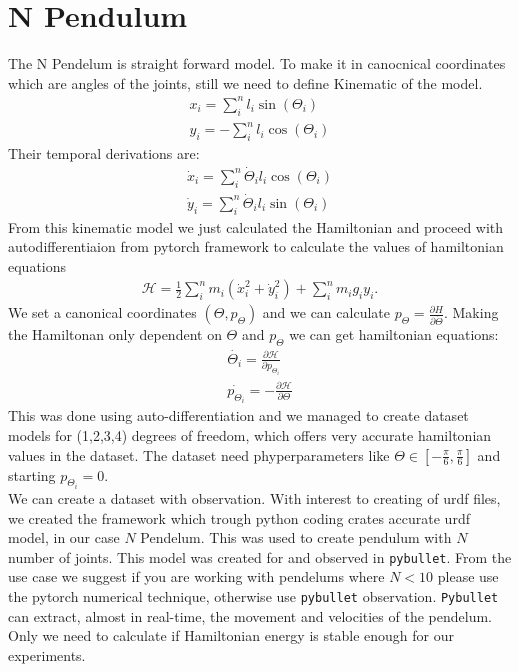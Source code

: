 	


 
 \section{N Pendulum}
 The N Pendelum is straight forward model.
 To make it in canocnical coordinates which are angles of the joints, still we need to define Kinematic of the model.
 \begin{eqnarray}
 	x_i = \sum_i^n l_i\sin(\Theta_i)\\
 	y_i = -\sum_i^n l_i\cos(\Theta_i)
 \end{eqnarray}
Their temporal derivations are:
\begin{eqnarray}
\dot{x}_i = \sum_i^n \dot{\Theta}_i l_i\cos(\Theta_i)\\
	\dot{y}_i = \sum_i^n \dot{\Theta}_i l_i\sin(\Theta_i)
 \end{eqnarray}
From this kinematic model we just calculated the Hamiltonian and proceed with autodifferentiaion from pytorch framework to calculate the values of hamiltonian equations
\begin{eqnarray}
	\mathcal{H} = \frac{1}{2}\sum_i^n m_i (\dot{x}_i^2 + \dot{y}_i^2) + \sum_i^n m_ig_iy_i. 
\end{eqnarray}
We set a canonical coordinates $(\Theta, p_{\Theta})$ and we can calculate $p_{\Theta} = \frac{\partial H}{\partial \dot{\Theta}}$.
Making the Hamiltonan only dependent on $\Theta$ and $p_{\Theta}$ we can get hamiltonian equations:
\begin{eqnarray}
	\dot{\Theta_i} = \frac{\partial \mathcal{H}}{\partial p_{\Theta_i}}\\
	\dot{p_{\Theta_i}} = -\frac{\partial \mathcal{H}}{\partial \Theta}
\end{eqnarray}
This was done using auto-differentiation and we managed to create dataset models for (1,2,3,4) degrees of freedom, which offers very accurate hamiltonian values in the dataset. 
The dataset need phyperparameters like  $\Theta \in [-\frac{\pi}{6},\frac{\pi}{6}]$ and starting $p_{\Theta_i} = 0 $.\\
We can create a dataset with observation. With interest to creating of urdf files, we created the framework which trough python coding crates accurate urdf model, in our case $N$ Pendelum. This was used to create pendulum with $N$  number of joints. This model was created for and  observed in \texttt{pybullet}\cite{pybullet}. From the use case we suggest if you are working with pendelums where $N<10$ please use the pytorch numerical technique, otherwise use \texttt{pybullet} observation. \texttt{Pybullet} can extract, almost in real-time, the movement and velocities of the pendelum. Only we need to calculate if Hamiltonian energy is stable enough for our experiments. 

